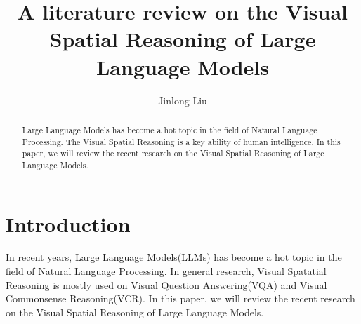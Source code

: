 \documentclass[journal,]{IEEEtran}
\title{A literature review on the Visual Spatial Reasoning of Large Language Models}
\begin{document}
\maketitle
\author{Jinlong Liu}
\begin{abstract}
Large Language Models has become a hot topic in the field of Natural Language Processing. The Visual Spatial Reasoning is a key ability of human intelligence. In this paper, we will review the recent research on the Visual Spatial Reasoning of Large Language Models.
\end{abstract}
\section{Introduction}
In recent years, Large Language Models(LLMs) has become a hot topic in the field of Natural Language Processing. In general research, Visual Spatatial Reasoning is mostly used on Visual Question Answering(VQA) and Visual Commonsense Reasoning(VCR). In this paper, we will review the recent research on the Visual Spatial Reasoning of Large Language Models.
\end{document}
